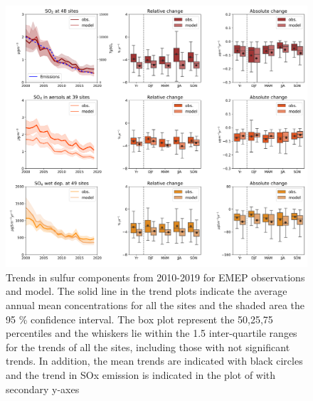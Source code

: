 \begin{figure}
	\centering
	\includegraphics[width=0.74\paperwidth]{FIGS_TRENDS/sulfur_trends.png}
	\caption{\label{fig:SOx_trends}Trends in sulfur components from 2010-2019 for EMEP observations and model. The solid line in the trend plots indicate the average annual mean concentrations for all the sites and the shaded area the 95 \% confidence interval. The box plot represent the 50,25,75 percentiles and the whiskers lie within the 1.5 inter-quartile ranges for the trends of all the sites, including those with not significant trends. In addition, the mean trends are indicated with black circles and the trend in SOx emission is indicated in the plot of \soii with secondary y-axes}
\end{figure}

